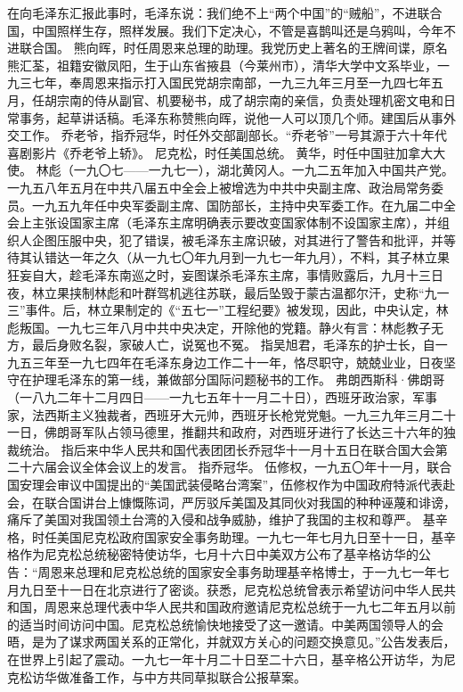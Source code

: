 \begin{maonote}
在向毛泽东汇报此事时，毛泽东说：我们绝不上“两个中国”的“贼船”，不进联合国，中国照样生存，照样发展。我们下定决心，不管是喜鹊叫还是乌鸦叫，今年不进联合国。
熊向晖，时任周恩来总理的助理。我党历史上著名的王牌间谍，原名熊汇荃，祖籍安徽凤阳，生于山东省掖县（今莱州市），清华大学中文系毕业，一九三七年，奉周恩来指示打入国民党胡宗南部，一九三九年三月至一九四七年五月，任胡宗南的侍从副官、机要秘书，成了胡宗南的亲信，负责处理机密文电和日常事务，起草讲话稿。毛泽东称赞熊向晖，说他一人可以顶几个师。建国后从事外交工作。
乔老爷，指乔冠华，时任外交部副部长。“乔老爷”一号其源于六十年代喜剧影片《乔老爷上轿》。
尼克松，时任美国总统。
黄华，时任中国驻加拿大大使。
林彪（一九〇七——一九七一），湖北黄冈人。一九二五年加入中国共产党。一九五八年五月在中共八届五中全会上被增选为中共中央副主席、政治局常务委员。一九五九年任中央军委副主席、国防部长，主持中央军委工作。在九届二中全会上主张设国家主席（毛泽东主席明确表示要改变国家体制不设国家主席），并组织人企图压服中央，犯了错误，被毛泽东主席识破，对其进行了警告和批评，并等待其认错达一年之久（从一九七〇年九月到一九七一年九月），不料，其子林立果狂妄自大，趁毛泽东南巡之时，妄图谋杀毛泽东主席，事情败露后，九月十三日夜，林立果挟制林彪和叶群驾机逃往苏联，最后坠毁于蒙古温都尔汗，史称“九一三”事件。后，林立果制定的《“五七一”工程纪要》被发现，因此，中央认定，林彪叛国。一九七三年八月中共中央决定，开除他的党籍。静火有言：林彪教子无方，最后身败名裂，家破人亡，说冤也不冤。
指吴旭君，毛泽东的护士长，自一九五三年至一九七四年在毛泽东身边工作二十一年，恪尽职守，兢兢业业，日夜坚守在护理毛泽东的第一线，兼做部分国际问题秘书的工作。
弗朗西斯科·佛朗哥（一八九二年十二月四日——一九七五年十一月二十日），西班牙政治家，军事家，法西斯主义独裁者，西班牙大元帅，西班牙长枪党党魁。一九三九年三月二十一日，佛朗哥军队占领马德里，推翻共和政府，对西班牙进行了长达三十六年的独裁统治。
指后来中华人民共和国代表团团长乔冠华十一月十五日在联合国大会第二十六届会议全体会议上的发言。
指乔冠华。
伍修权，一九五〇年十一月，联合国安理会审议中国提出的“美国武装侵略台湾案”，伍修权作为中国政府特派代表赴会，在联合国讲台上慷慨陈词，严厉驳斥美国及其同伙对我国的种种诬蔑和诽谤，痛斥了美国对我国领土台湾的入侵和战争威胁，维护了我国的主权和尊严。
基辛格，时任美国尼克松政府国家安全事务助理。一九七一年七月九日至十一日，基辛格作为尼克松总统秘密特使访华，七月十六日中美双方公布了基辛格访华的公告：“周恩来总理和尼克松总统的国家安全事务助理基辛格博士，于一九七一年七月九日至十一日在北京进行了密谈。获悉，尼克松总统曾表示希望访问中华人民共和国，周恩来总理代表中华人民共和国政府邀请尼克松总统于一九七二年五月以前的适当时间访问中国。尼克松总统愉快地接受了这一邀请。中美两国领导人的会晤，是为了谋求两国关系的正常化，并就双方关心的问题交换意见。”公告发表后，在世界上引起了震动。一九七一年十月二十日至二十六日，基辛格公开访华，为尼克松访华做准备工作，与中方共同草拟联合公报草案。

\end{maonote}
